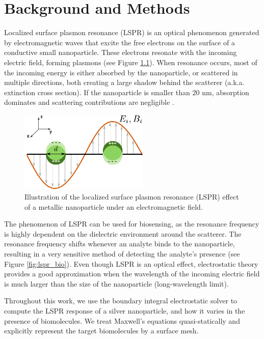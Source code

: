 
\chapter{Background and Methods} \label{chap:methods}
\graphicspath{{background_methods/figs/}}


Localized surface plasmon resonance (LSPR) is an optical phenomenon generated by electromagnetic waves 
that excite the free electrons on the surface of a conductive small nanoparticle. These electrons resonate  
with the incoming electric field, forming plasmons (see Figure \ref{fig:lspr}). When resonance occurs, 
most of the incoming energy is either absorbed by the nanoparticle, or scattered in multiple directions, both
creating a large shadow behind the scatterer (a.k.a. extinction cross section). If the nanoparticle is 
smaller than $20$ nm, absorption dominates and scattering contributions are negligible \cite{PetryayevaKrull2011, OlsonETal2015}.

\begin{figure}
   \centering
     \includegraphics[width=0.55\textwidth]{lspr.pdf} 
     \caption{Illustration of the localized surface plasmon resonance (LSPR) effect of a metallic nanoparticle under an electromagnetic field.}
     \label{fig:lspr}
\end{figure}

The phenomenon of LSPR can be used for biosensing, as the resonance frequency is highly dependent on the dielectric environment 
around the scatterer. The resonance frequency shifts whenever an analyte binds to the nanoparticle, 
resulting in a very sensitive method of detecting the analyte's presence \cite{HaesVanduyne2002,HaesETal2004}
(see Figure \ref{fig:lspr_bio}). Even though LSPR is an optical effect, electrostatic theory
provides a good approximation when the wavelength of the incoming electric field is much larger than 
the size of the nanoparticle (long-wavelength limit). 

Throughout this work, we use the boundary integral electrostatic solver \pygbe \cite{ClementiETal2017} to compute 
the LSPR response of a silver nanoparticle, and how it varies in the presence of biomolecules. We treat Maxwell's equations
quasi-statically \cite{MayergoyzZhang2007} and explicitly represent the target biomolecules by a surface mesh.

